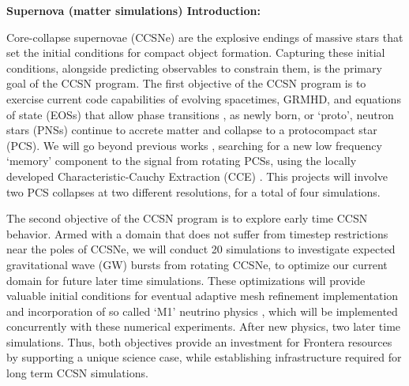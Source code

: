 \documentclass[12pt]{article}
\begin{document}
\setcounter{page}{1}  \renewcommand{\thepage}
           {\arabic{page} }%




\textbf{Supernova (matter simulations) Introduction: }

Core-collapse supernovae (CCSNe) are the explosive endings of massive stars that set the initial conditions for compact object formation.  Capturing these initial conditions, alongside predicting observables to constrain them, is the primary goal of the CCSN program.  The first objective of the CCSN program is to exercise current code capabilities of evolving spacetimes, GRMHD, and equations of state (EOSs) that allow phase transitions \citep{legred:2023}, as newly born, or `proto', neutron stars (PNSs) continue to accrete matter and collapse to a protocompact star (PCS).  We will go beyond previous works \citep{zha:2020}, searching for a new low frequency `memory' component to the signal from rotating PCSs, using the locally developed Characteristic-Cauchy Extraction (CCE) \citep{moxon:2021}.  This projects will involve two PCS collapses at two different resolutions, for a total of four simulations.

The second objective of the CCSN program is to explore early time CCSN behavior.  Armed with a domain that does not suffer from timestep restrictions near the poles of CCSNe, we will conduct 20 simulations to investigate expected gravitational wave (GW) bursts from rotating CCSNe, to optimize our current domain for future later time simulations.  These optimizations will provide valuable initial conditions for eventual adaptive mesh refinement implementation and incorporation of so called `M1' neutrino physics \citep{shibata:2011}, which will be implemented concurrently with these numerical experiments.  After new physics, two later time simulations.  Thus, both objectives provide an investment for Frontera resources by supporting a unique science case, while establishing infrastructure required for long term CCSN simulations.
\end{document}
